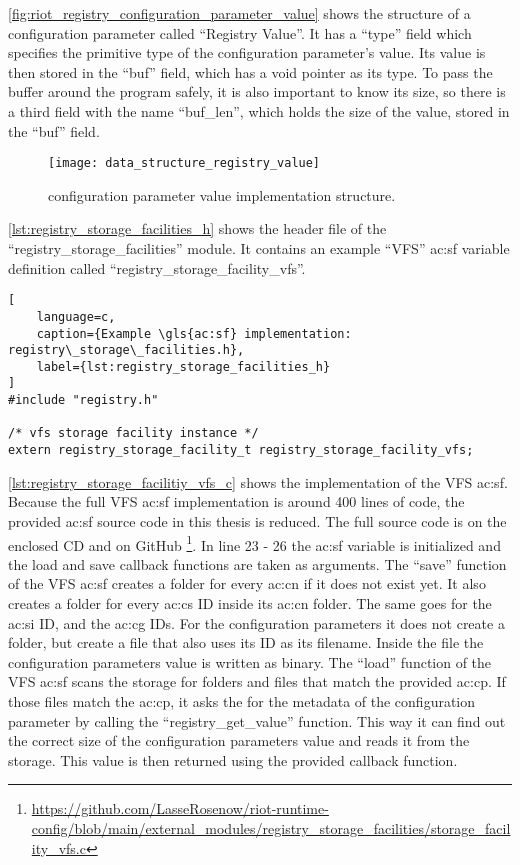 {\autoref{fig:riot_registry_configuration_parameter_value} shows the structure of a configuration parameter called ``Registry Value''.
It has a ``type'' field which specifies the primitive type of the configuration parameter's value.
Its value is then stored in the ``buf'' field, which has a void pointer as its type.
To pass the buffer around the program safely, it is also important to know its size, so there is a third field with the name ``buf\_len'', which holds the size of the value, stored in the ``buf'' field.

\begin{figure}[H]
    \centering
    \texttt{[image: data\_structure\_registry\_value]}
    \caption{ configuration parameter value implementation structure.}
    \label{fig:riot_registry_configuration_parameter_value}
\end{figure}

\autoref{lst:registry_storage_facilities_h} shows the header file of the ``registry\_storage\_facilities'' module.
It contains an example ``VFS'' \gls{ac:sf} variable definition called ``registry\_storage\_facility\_vfs''.

\begin{lstlisting}[
    language=c,
    caption={Example \gls{ac:sf} implementation: registry\_storage\_facilities.h},
    label={lst:registry_storage_facilities_h}
]
#include "registry.h"

/* vfs storage facility instance */
extern registry_storage_facility_t registry_storage_facility_vfs;
\end{lstlisting}

\autoref{lst:registry_storage_facilitiy_vfs_c} shows the implementation of the VFS \gls{ac:sf}.
Because the full VFS \gls{ac:sf} implementation is around 400 lines of code, the provided \gls{ac:sf} source code in this thesis is reduced.
The full source code is on the enclosed CD and on GitHub \footnote{\url{https://github.com/LasseRosenow/riot-runtime-config/blob/main/external_modules/registry_storage_facilities/storage_facility_vfs.c}}.
In line 23 - 26 the \gls{ac:sf} variable is initialized and the load and save callback functions are taken as arguments.
The ``save'' function of the VFS \gls{ac:sf} creates a folder for every \gls{ac:cn} if it does not exist yet. It also creates a folder for every \gls{ac:cs} ID inside its \gls{ac:cn} folder. The same goes for the \gls{ac:si} ID, and the \gls{ac:cg} IDs. For the configuration parameters it does not create a folder, but create a file that also uses its ID as its filename.
Inside the file the configuration parameters value is written as binary.
The ``load'' function of the VFS \gls{ac:sf} scans the storage for folders and files that match the provided \gls{ac:cp}.
If those files match the \gls{ac:cp}, it asks the  for the metadata of the configuration parameter by calling the ``registry\_get\_value'' function.
This way it can find out the correct size of the configuration parameters value and reads it from the storage.
This value is then returned using the provided callback function.

}
